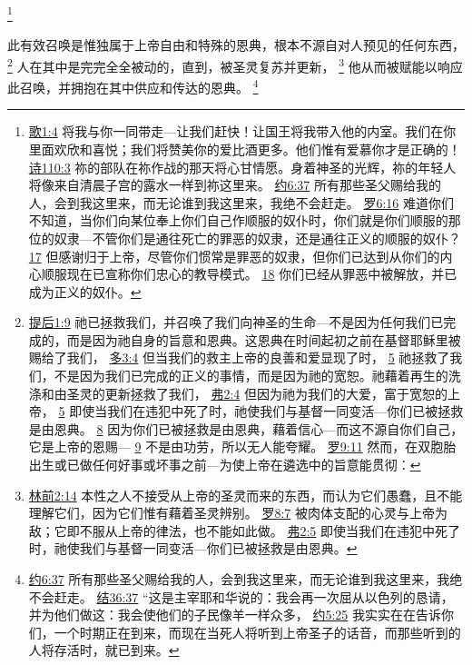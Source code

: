 \documentclass[12pt, a4paper, oneside]{ctexart}
\newcounter{parnum}[section]
\newcommand{\N}{%
   \noindent\refstepcounter{parnum}%
    \makebox[\parindent][l]{\textbf{\arabic{parnum}.}}}
\begin{document}
	\footnote {
		\href{https://biblehub.com/songs/1-4.htm}{歌1:4} 将我与你一同带走---让我们赶快！让国王将我带入他的内室。我们在你里面欢欣和喜悦；我们将赞美你的爱比酒更多。他们惟有爱慕你才是正确的！
		\href{https://biblehub.com/psalms/110-3.htm}{诗110:3} 祢的部队在祢作战的那天将心甘情愿。身着神圣的光辉，祢的年轻人将像来自清晨子宫的露水一样到祢这里来。
		\href{https://biblehub.com/john/6-37.htm}{约6:37} 所有那些圣父赐给我的人，会到我这里来，而无论谁到我这里来，我绝不会赶走。
		\href{https://biblehub.com/romans/6-16.htm}{罗6:16} 难道你们不知道，当你们向某位奉上你们自己作顺服的奴仆时，你们就是你们顺服的那位的奴隶---不管你们是通往死亡的罪恶的奴隶，还是通往正义的顺服的奴仆？
		\href{https://biblehub.com/romans/6-17.htm}{17} 但感谢归于上帝，尽管你们惯常是罪恶的奴隶，但你们已达到从你们的内心顺服现在已宣称你们忠心的教导模式。
		\href{https://biblehub.com/romans/6-18.htm}{18} 你们已经从罪恶中被解放，并已成为正义的奴仆。
	}

\N 此有效召唤是惟独属于上帝自由和特殊的恩典，根本不源自对人预见的任何东西，
	\footnote {
		\href{https://biblehub.com/2_timothy/1-9.htm}{提后1:9} 祂已拯救我们，并召唤了我们向神圣的生命---不是因为任何我们已完成的，而是因为祂自身的旨意和恩典。这恩典在时间起初之前在基督耶稣里被赐给了我们，
		\href{https://biblehub.com/titus/3-4.htm}{多3:4} 但当我们的救主上帝的良善和爱显现了时，
		\href{https://biblehub.com/titus/3-5.htm}{5} 祂拯救了我们，不是因为我们已完成的正义的事情，而是因为祂的宽恕。祂藉着再生的洗涤和由圣灵的更新拯救了我们，
		\href{https://biblehub.com/ephesians/2-4.htm}{弗2:4} 但因为祂为我们的大爱，富于宽恕的上帝，
		\href{https://biblehub.com/ephesians/2-5.htm}{5} 即使当我们在违犯中死了时，祂使我们与基督一同变活---你们已被拯救是由恩典。
		\href{https://biblehub.com/ephesians/2-8.htm}{8} 因为你们已被拯救是由恩典，藉着信心---而这不源自你们自己，它是上帝的恩赐---
		\href{https://biblehub.com/ephesians/2-9.htm}{9} 不是由功劳，所以无人能夸耀。
		\href{https://biblehub.com/romans/9-11.htm}{罗9:11} 然而，在双胞胎出生或已做任何好事或坏事之前---为使上帝在遴选中的旨意能贯彻：
	}
	人在其中是完完全全被动的，直到，被圣灵复苏并更新，
	\footnote {
		\href{https://biblehub.com/1_corinthians/2-14.htm}{林前2:14} 本性之人不接受从上帝的圣灵而来的东西，而认为它们愚蠢，且不能理解它们，因为它们惟有藉着圣灵辨别。
		\href{https://biblehub.com/romans/8-7.htm}{罗8:7} 被肉体支配的心灵与上帝为敌；它即不服从上帝的律法，也不能如此做。
		\href{https://biblehub.com/ephesians/2-5.htm}{弗2:5} 即使当我们在违犯中死了时，祂使我们与基督一同变活---你们已被拯救是由恩典。
	}
	他从而被赋能以响应此召唤，并拥抱在其中供应和传达的恩典。
	\footnote {
		\href{https://biblehub.com/john/6-37.htm}{约6:37} 所有那些圣父赐给我的人，会到我这里来，而无论谁到我这里来，我绝不会赶走。
		\href{https://biblehub.com/ezekiel/36-37.htm}{结36:37} “这是主宰耶和华说的：我会再一次屈从以色列的恳请，并为他们做这：我会使他们的子民像羊一样众多，
		\href{https://biblehub.com/john/5-25.htm}{约5:25} 我实实在在告诉你们，一个时期正在到来，而现在当死人将听到上帝圣子的话音，而那些听到的人将存活时，就已到来。
	}
\end{document}
